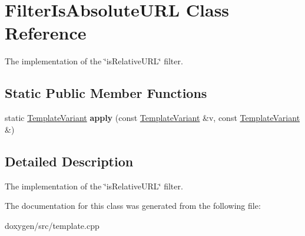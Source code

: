 \hypertarget{class_filter_is_absolute_u_r_l}{}\section{Filter\+Is\+Absolute\+U\+RL Class Reference}
\label{class_filter_is_absolute_u_r_l}


The implementation of the \char`\"{}is\+Relative\+U\+R\+L\char`\"{} filter.  


\subsection*{Static Public Member Functions}
\begin{DoxyCompactItemize}
\item 
\mbox{\label{class_filter_is_absolute_u_r_l_a5af4caa52dbe1e90b66ed9c0e8f4b9ea}} 
static \mbox{\hyperlink{class_template_variant}{Template\+Variant}} {\bfseries apply} (const \mbox{\hyperlink{class_template_variant}{Template\+Variant}} \&v, const \mbox{\hyperlink{class_template_variant}{Template\+Variant}} \&)
\end{DoxyCompactItemize}


\subsection{Detailed Description}
The implementation of the \char`\"{}is\+Relative\+U\+R\+L\char`\"{} filter. 

The documentation for this class was generated from the following file\+:\begin{DoxyCompactItemize}
\item 
doxygen/src/template.\+cpp\end{DoxyCompactItemize}
